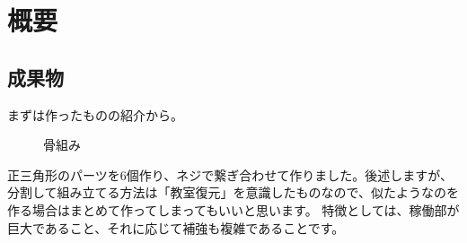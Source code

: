 \documentclass{jsarticle}
\begin{document}
\section{概要}
\subsection{成果物}

まずは作ったものの紹介から。

\begin{figure}[htbp]
    \centering
    \caption[]{骨組み}
    \label{figs:骨組み}
\end{figure}

正三角形のパーツを6個作り、ネジで繋ぎ合わせて作りました。後述しますが、分割して組み立てる方法は「教室復元」を意識したものなので、似たようなのを作る場合はまとめて作ってしまってもいいと思います。
特徴としては、稼働部が巨大であること、それに応じて補強も複雑であることです。
\end{document}
